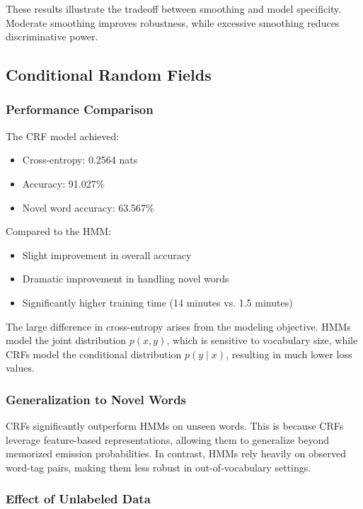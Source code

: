 \documentclass{article}
\begin{document}
These results illustrate the tradeoff between smoothing and model specificity. Moderate smoothing improves robustness, while excessive smoothing reduces discriminative power.

\subsection{Conditional Random Fields}

\subsubsection{Performance Comparison}

The CRF model achieved:

\begin{itemize}
    \item Cross-entropy: 0.2564 nats
    \item Accuracy: 91.027\%
    \item Novel word accuracy: 63.567\%
\end{itemize}

Compared to the HMM:

\begin{itemize}
    \item Slight improvement in overall accuracy
    \item Dramatic improvement in handling novel words
    \item Significantly higher training time (14 minutes vs. 1.5 minutes)
\end{itemize}

The large difference in cross-entropy arises from the modeling objective. HMMs model the joint distribution $p(x, y)$, which is sensitive to vocabulary size, while CRFs model the conditional distribution $p(y \mid x)$, resulting in much lower loss values.

\subsubsection{Generalization to Novel Words}

CRFs significantly outperform HMMs on unseen words. This is because CRFs leverage feature-based representations, allowing them to generalize beyond memorized emission probabilities. In contrast, HMMs rely heavily on observed word-tag pairs, making them less robust in out-of-vocabulary settings.

\subsubsection{Effect of Unlabeled Data}
\end{document}
